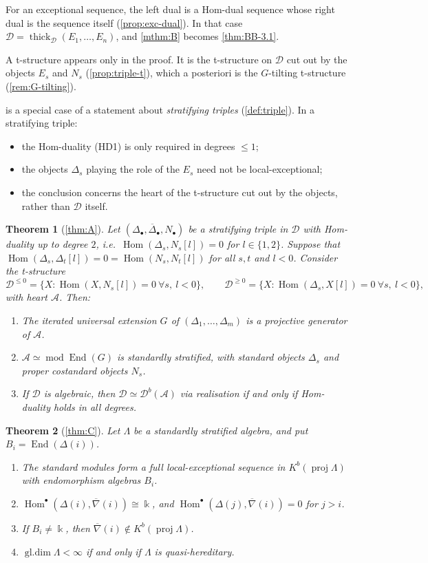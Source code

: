 \documentclass[11pt,reqno]{amsart}
\theoremstyle{plain}
\newtheorem{maintheoreminner}{Theorem}
\newenvironment{maintheorem}[1]{\renewcommand{\themaintheoreminner}{#1}\begin{maintheoreminner}}{\end{maintheoreminner}}
\theoremstyle{definition}
\theoremstyle{remark}
\newcommand{\kk}{\Bbbk}
\DeclareMathOperator{\Hom}{Hom}
\DeclareMathOperator{\End}{End}
\DeclareMathOperator{\gldim}{gl.dim}
\newcommand{\modd}{\operatorname{mod}}
\newcommand{\proj}{\operatorname{proj}}
\newcommand{\Db}{\mathcal{D}^b}
\newcommand{\Kb}{K^b}
\newcommand{\thick}[2][\cD]{\operatorname{thick}_{#1}(#2)}
\newcommand{\nablabar}{\overline{\nabla}}
\newcommand{\Deltabar}{\overline{\Delta}}
\newcommand{\cD}{\mathcal{D}}
\newcommand{\cA}{\mathcal{A}}
\begin{document}
For an exceptional sequence, the left dual is a Hom-dual sequence whose right dual is the sequence itself (\cref{prop:exc-dual}). In that case $\cD=\thick{E_1,\dots,E_n}$, and \cref{mthm:B} becomes \cref{thm:BB-3.1}.

A t-structure appears only in the proof. It is the t-structure on $\cD$ cut out by the objects $E_s$ and $N_s$ (\cref{prop:triple-t}), which a posteriori is the $G$-tilting t-structure (\cref{rem:G-tilting}).

 is a special case of a statement about \emph{stratifying triples} (\cref{def:triple}). In a stratifying triple:
\begin{itemize}
\item the Hom-duality (HD1) is only required in degrees $\le1$;
\item the objects $\Delta_s$ playing the role of the $E_s$ need not be local-exceptional;
\item the conclusion concerns the heart of the t-structure cut out by the objects, rather than $\cD$ itself.
\end{itemize}

\begin{maintheorem}{A}[\cref{thm:A}]\label{mthm:A}
Let $(\Delta_\bullet,\Deltabar_\bullet,N_\bullet)$ be a stratifying triple in $\cD$ with Hom-duality up to degree $2$, i.e.\ $\Hom(\Delta_s,N_s[l])=0$ for $l\in\{1,2\}$. Suppose that $\Hom(\Delta_s,\Delta_t[l])=0=\Hom(N_s,N_t[l])$ for all $s,t$ and $l<0$. Consider the t-structure
\[\cD^{\le0}=\{X:\Hom(X,N_s[l])=0\ \forall s,\ l<0\},\qquad\cD^{\ge0}=\{X:\Hom(\Delta_s,X[l])=0\ \forall s,\ l<0\},\]
with heart $\cA$. Then:
\begin{enumerate}
\item The iterated universal extension $G$ of $(\Delta_1,\dots,\Delta_m)$ is a projective generator of $\cA$.
\item $\cA\simeq\modd\End(G)$ is standardly stratified, with standard objects $\Delta_s$ and proper costandard objects $N_s$.
\item If $\cD$ is algebraic, then $\cD\simeq\Db(\cA)$ via realisation if and only if Hom-duality holds in all degrees.
\end{enumerate}
\end{maintheorem}

\begin{maintheorem}{C}[\cref{thm:C}]\label{mthm:C}
Let $\Lambda$ be a standardly stratified algebra, and put $B_i=\End(\Delta(i))$.
\begin{enumerate}
\item The standard modules form a full local-exceptional sequence in $\Kb(\proj\Lambda)$ with endomorphism algebras $B_i$.
\item $\Hom^\bullet(\Delta(i),\nablabar(i))\cong\kk$, and $\Hom^\bullet(\Delta(j),\nablabar(i))=0$ for $j>i$.
\item If $B_i\neq\kk$, then $\nablabar(i)\notin\Kb(\proj\Lambda)$.
\item $\gldim\Lambda<\infty$ if and only if $\Lambda$ is quasi-hereditary.
\end{enumerate}
\end{maintheorem}
\end{document}
